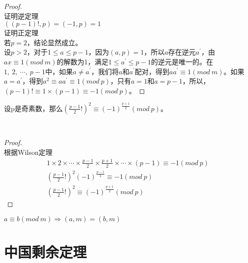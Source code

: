 \documentclass[cn,10pt]{elegantbook}
\begin{document}
\begin{proof}
  \\ 证明逆定理
  \\$((p-1)!,p) = (-1,p )= 1$
  \\证明正定理
  \\若$p =2$，结论显然成立。
  \\设$p>2$，对于$1 \leq a \leq p-1$，因为$(a,p)=1$，所以$a$存在逆元$a^{\prime}$，由$ax \equiv 1 (mod\ m )$的解数为1，满足$1 \leq a^{\prime} \leq p-1$的逆元是唯一的。在$1,\ 2,\ \cdots,\ p-1$中，如果$a \neq a^{\prime}$，我们将$a$和$a^{\prime}$配对，得到$aa^{\prime} \equiv 1(mod\ m)$。如果$a = a^{\prime}$，得到$a^2 \equiv aa^{\prime} \equiv 1(mod\ p)$，只有$a =1$和$a =p-1$，所以，$(p-1)! \equiv 1 \times (p-1) \equiv -1(mod\ p)$。
\end{proof}
\vskip 0.5cm
\begin{conclusion}
  设p是奇素数，那么$(\frac{p-1}{2}!)^2 \equiv (-1)^{\frac{p+1}{2}}(mod\ p)$。
\end{conclusion}  
\
\begin{proof}
  \\根据Wilson定理
  \begin{align*}
    1 \times 2 \times \cdots \times \frac{p-1}{2} \times \frac{p+1}{2} \times \cdots \times (p-1) \equiv -1(mod\ p)
    \\ (\frac{p-1}{2}!)^2(-1)^{\frac{p-1}{2}} \equiv -1(mod\ p)
    \\ (\frac{p-1}{2}!)^2 \equiv (-1)^{\frac{p+1}{2}}(mod\ p)
  \end{align*}
\end{proof}
\begin{note}
  $a \equiv b (mod\ m) \Rightarrow (a,m)=(b,m)$
\end{note}
\section{中国剩余定理}
\end{document}
